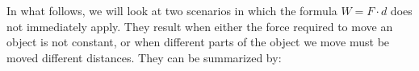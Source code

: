 \documentclass{ximera}
\begin{document}
%
%
%
%
%

In what follows, we will look at two scenarios in which the formula $W=F \cdot d$ does not immediately apply.  They result when either the force required to move an object is not constant, or when different parts of the object we move must be moved different distances.  They can be summarized by:
\end{document}
